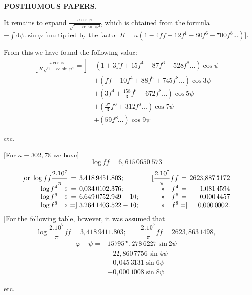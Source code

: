 \par\clearpage
{}\hfill{\small\textbf{POSTHUMOUS PAPERS.}}\hfill\null\par\medskip
It remains to expand \(\frac{a\cos\varphi}{\sqrt{1-ee\sin\varphi^2}}\), which is obtained from the formula \(-\int\mathrm{d}\psi.\sin\varphi\) [multiplied by the factor \(K=a(1-4ff-12f^4-80f^6-700f^8\ldots)\)].

From this we have found the following value:
\[
\begin{aligned}
\left[\frac{a\cos\varphi}{K\sqrt{1-ee\sin\varphi^2}}={}\right]
&\,(1+3ff+15f^4+87f^6+528f^8\ldots)\cos\psi\\
&+(ff+10f^4+88f^6+745f^8\ldots)\cos3\psi\\
&+\left(3f^4+\frac{158}{3}f^6+672f^8\ldots\right)\cos5\psi\\
&+\left(\frac{37}{3}f^6+312f^8\ldots\right)\cos7\psi\\
&+(59f^8\ldots)\cos9\psi
\end{aligned}
\]
{\centering etc.\par}
\bigskip
{\centering [28.]\par}
[For \(n=302{,}78\) we have]
\[
\log ff=6{,}615\,0650.573
\]
\[
\begin{array}{@{}r@{\;}c@{\;}l@{\qquad}r@{\;}c@{\;}r@{}}
[\text{or }\log ff\dfrac{2.10^7}{\pi}&=&3{,}418\,9451.803;&[\dfrac{2.10^7}{\pi}ff&=&2623{,}887\,3172\\[3pt]
\log f^4\quad\text{»}&=&0{,}034\,0102.376;&\text{»}\quad f^4&=&1{,}081\,4594\\
\log f^6\quad\text{»}&=&6{,}649\,0752.949-10;&\text{»}\quad f^6&=&0{,}000\,4457\\
\log f^8\quad\text{»}&=]&3{,}264\,1403.522-10;&\text{»}\quad f^8&=]&0{,}000\,0002.
\end{array}
\]
[For the following table, however, it was assumed that]
\[
\log\frac{2.10^7}{\pi}ff=3{,}418\,9411.803;\qquad
\frac{2.10^7}{\pi}ff=2623{,}863\,1498,
\]
\noindent [to which \(n=302{,}7827\ldots\) would correspond. For this value of \(ff\), the following relations hold between \(\psi,\varphi\) and \(\omega\) when these quantities are measured in metres, that is, in \(10\,000\,000\)ths of the quadrant:]
\[
\begin{aligned}
\varphi-\psi={}&15795^{\mathrm{m}}{,}278\,6227\sin2\psi\\
&+22{,}860\,7756\sin4\psi\\
&+0{,}045\,3131\sin6\psi\\
&+0{,}000\,1008\sin8\psi
\end{aligned}
\]
{\centering etc.\par}

